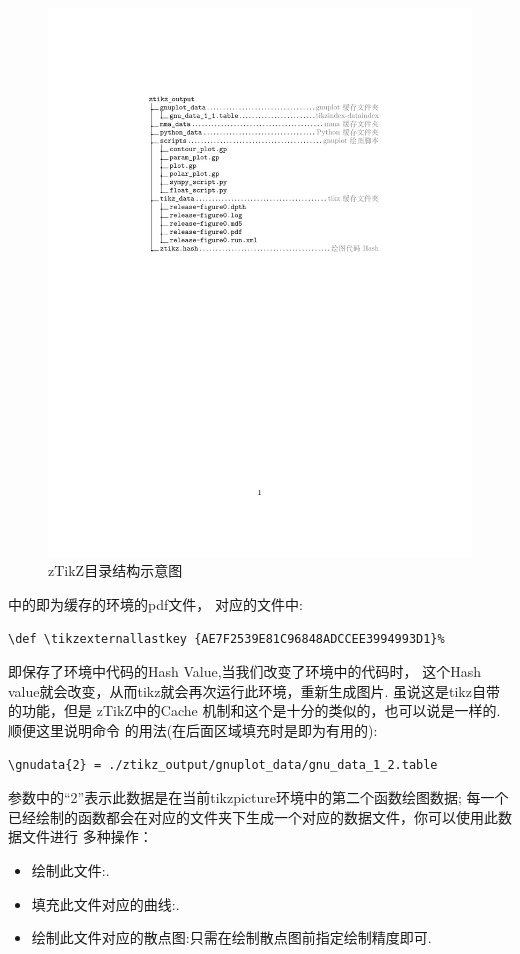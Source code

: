 \begin{figure}[!htb]
    \centering
    \includegraphics[width=.75\linewidth]{./pics/ztikz_tree.pdf}
    \caption{zTikZ目录结构示意图}
    \label{fig:zTikZ-directory}
\end{figure}

中的即为缓存的环境的pdf文件，
对应的文件中:

\begin{verbatim}
\def \tikzexternallastkey {AE7F2539E81C96848ADCCEE3994993D1}%
\end{verbatim}

即保存了环境中代码的Hash Value,当我们改变了环境中的代码时，
这个Hash value就会改变，从而tikz就会再次运行此环境，重新生成图片. 虽说这是tikz自带的功能，但是 
zTikZ中的Cache 机制和这个是十分的类似的，也可以说是一样的. 顺便这里说明命令\cmd{\gnudata}
的用法(在后面区域填充时是即为有用的):

\begin{verbatim}
\gnudata{2} = ./ztikz_output/gnuplot_data/gnu_data_1_2.table
\end{verbatim}

\cmd{\gnudata}参数中的``2''表示此数据是在当前tikzpicture环境中的第二个函数绘图数据; 
每一个已经绘制的函数都会在对应的文件夹下生成一个对应的数据文件，你可以使用此数据文件进行
多种操作：
\begin{itemize}
    \item 绘制此文件:.
    \item 填充此文件对应的曲线:.
    \item 绘制此文件对应的散点图:只需在绘制散点图前指定绘制精度即可.
\end{itemize}

